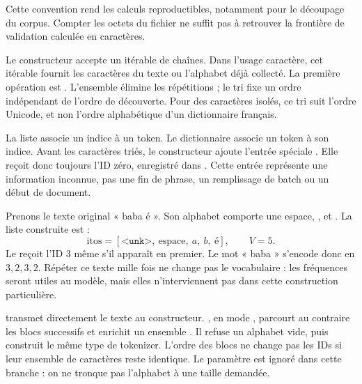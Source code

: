 Cette convention rend les calculs reproductibles, notamment pour le découpage
du corpus. Compter les octets du fichier ne suffit pas à retrouver la frontière
de validation calculée en caractères.


Le constructeur accepte un itérable de chaînes. Dans l'usage caractère,
cet itérable fournit les caractères du texte ou l'alphabet déjà collecté.
La première opération est .
L'ensemble élimine les répétitions ; le tri fixe un ordre indépendant de
l'ordre de découverte. Pour des caractères isolés, ce tri suit l'ordre Unicode,
et non l'ordre alphabétique d'un dictionnaire français.

La liste  associe un indice à un token. Le dictionnaire
 associe un token à son indice. Avant les caractères triés,
le constructeur ajoute l'entrée spéciale . Elle reçoit donc
toujours l'ID zéro, enregistré dans .
Cette entrée représente une information inconnue, pas une fin de phrase,
un remplissage de batch ou un début de document.

Prenons le texte original « baba é ». Son alphabet comporte une espace,
,  et . La liste construite est :
\[
    \mathrm{itos}=[\texttt{<unk>},\ \text{espace},\ a,\ b,\ \text{é}],
    \qquad V=5.
\]
Le  reçoit l'ID 3 même s'il apparaît en premier.
Le mot « baba » s'encode donc en \(3,2,3,2\).
Répéter ce texte mille fois ne change pas le vocabulaire :
les fréquences seront utiles au modèle, mais elles n'interviennent pas
dans cette construction particulière.

 transmet directement le texte au constructeur.
, en mode , parcourt au contraire les blocs
successifs et enrichit un ensemble . Il refuse un alphabet vide,
puis construit le même type de tokenizer. L'ordre des blocs ne change pas les
IDs si leur ensemble de caractères reste identique. Le paramètre
 est ignoré dans cette branche : on ne tronque pas l'alphabet
à une taille demandée.


